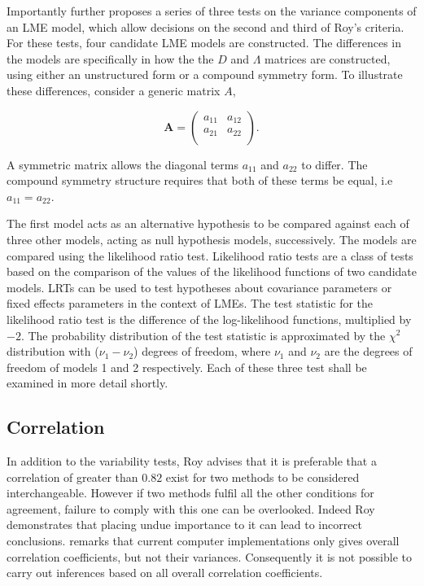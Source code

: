 Importantly \citet{roy} further proposes a series of three tests on the variance components of an LME model, which allow decisions on the second and third of Roy's criteria. For these tests, four candidate LME models are constructed. The differences in the models are specifically in how the the $D$ and $\Lambda$ matrices are constructed, using either an unstructured form or a compound symmetry form. To illustrate these differences, consider a generic matrix $A$,

\[
\boldsymbol{A} = \left( \begin{array}{cc}
    a_{11} & a_{12}  \\
    a_{21} & a_{22}  \\
    \end{array}\right).
\]

A symmetric matrix allows the diagonal terms $a_{11}$ and $a_{22}$ to differ. The compound symmetry structure requires that both of these terms be equal, i.e $a_{11} = a_{22}$.

The first model acts as an alternative hypothesis to be compared against each of three other models, acting as null hypothesis models, successively. The models are compared using the likelihood ratio test. Likelihood ratio tests are a class of tests based on the comparison of the values of the likelihood functions of two candidate models. LRTs can be used to test hypotheses about covariance parameters or fixed effects parameters in the context of LMEs. The test statistic for the likelihood ratio test is the difference of the log-likelihood functions, multiplied by $-2$.
The probability distribution of the test statistic is approximated by the $\chi^2$ distribution with ($\nu_{1} - \nu_{2}$) degrees of freedom, where $\nu_{1}$ and $\nu_{2}$ are the degrees of freedom of models 1 and 2 respectively. Each of these three test shall be examined in more detail shortly.

\subsection{Correlation}
In addition to the variability tests, Roy advises that it is preferable that a correlation of greater than $0.82$ exist for two methods to be considered interchangeable. However if two methods fulfil all the other conditions for agreement, failure to comply with this one can be overlooked. Indeed Roy demonstrates that placing undue importance to it can lead to incorrect conclusions. \citet{roy} remarks that current computer implementations only gives overall correlation coefficients, but not their variances. Consequently it is not possible to carry out inferences based on all overall correlation coefficients.

